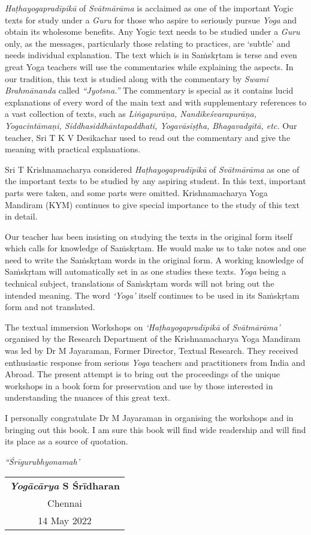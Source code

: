 \textit{Haṭhayogapradīpikā} of \textit{Svātmārāma} is acclaimed as one of the important Yogic texts for study under a \textit{Guru} for those who aspire to seriously pursue \textit{Yoga} and obtain its wholesome benefits. Any Yogic text needs to be studied under a \textit{Guru} only, as the messages, particularly those relating to practices, are ‘subtle’ and needs individual explanation. The text which is in Saṁskṛtam is terse and even great Yoga teachers will use the commentaries while explaining the aspects. In our tradition, this text is studied along with the commentary by \textit{Swami Brahmānanda} called \textit{“Jyotsna.”} The commentary is special as it contains lucid explanations of every word of the main text and with supplementary references to a vast collection of texts, such as \textit{Liṅgapurāṇa, Nandikeśvarapurāṇa, Yogacintāmaṇi, Siddhasiddhāntapaddhati, 
Yogavāsiṣṭha, Bhagavadgītā, etc.} Our teacher, Sri T K V Desikachar used to read out the commentary and give the meaning with practical explanations.

Sri T Krishnamacharya considered \textit{Haṭhayogapradīpikā} of \textit{Svātmārāma} as one of the important texts to be studied by any aspiring student.  In this text, important parts were taken, and some parts were omitted. Krishnamacharya Yoga Mandiram (KYM) continues to give special importance to the study of this text in detail.

Our teacher has been insisting on studying the texts in the original form itself which calls for knowledge of Saṁskṛtam.  He would make us to take notes and one need to write the Saṁskṛtam words in the original form.  A working knowledge of Saṁskṛtam will automatically set in as one studies these texts. \textit{Yoga} being a technical subject, translations of Saṁskṛtam words will not bring out the intended meaning. The word \textit{‘Yoga’} itself continues to be used in its Saṁskṛtam form and not translated.

The textual immersion Workshops on \textit{‘Haṭhayogapradīpikā} of \textit{Svātmā\-rāma’} organised by the Research Department of the Krishnamacharya Yoga Mandiram was led by Dr M Jayaraman, Former Director, Textual Research. They received enthusiastic response from serious \textit{Yoga} teachers and practitioners from India and Abroad. The present attempt is to bring out the proceedings of the unique workshops in a book form for preservation and use by those interested in understanding the nuances of this great text.

I personally congratulate Dr M Jayaraman in organising the workshops and in bringing out this book.  I am sure this book will find wide readership and will find its place as a source of quotation.
\bigskip

\centerline{\textit{“Śrīgurubhyonamah’}}
\bigskip

\begin{flushright} 
\begin{tabular}{c}
\textbf{\textit{Yogācārya} S Śrīdharan}\\
Chennai\\
14 May 2022
\end{tabular}
\end{flushright}
